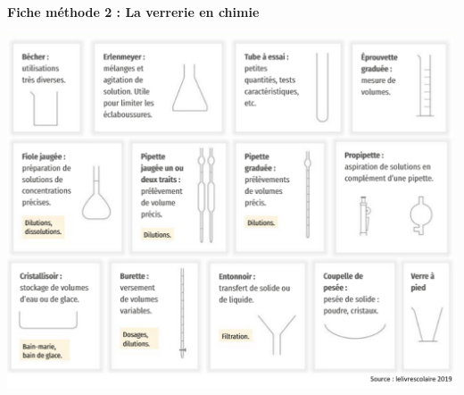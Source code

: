 \newpage

\renewcommand{\thesubsection}{\textcolor{red}{\Roman{section}.\arabic{subsection}}}
\renewcommand{\thesubsubsection}{\textcolor{red}{\Roman{section}.\arabic{subsection}.\alph{subsubsection}}}

\setcounter{section}{0}
\sndEnTeteMethodoDeux


\begin{mdframed}[style=titr, leftmargin=60pt, rightmargin=60pt, innertopmargin=7pt, innerbottommargin=7pt, innerrightmargin=8pt, innerleftmargin=8pt]

\begin{center}
\large{\textbf{Fiche méthode 2 : La verrerie en chimie}}
\end{center}
\end{mdframed}


\begin{center}
    \includegraphics[scale=0.75]{Images/Methodo/Verrerie/Verrerie_completer.png}
\end{center}

